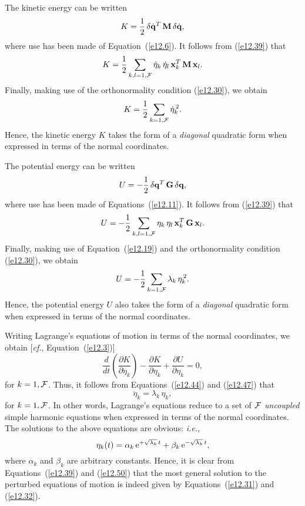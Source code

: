 The kinetic
energy can be written 
\begin{equation}
K = \frac{1}{2}\,\delta \dot{\bf q}^T\,{\bf M}\,\delta\dot{\bf q},
\end{equation}
where use has been made of Equation~(\ref{e12.6}).
It follows from (\ref{e12.39}) that
\begin{equation}
K = \frac{1}{2}\sum_{k,l=1,{\cal F}} \dot{\eta}_k\,\dot{\eta}_l\,{\bf x}_k^T\,{\bf M}\,{\bf x}_l.
\end{equation}
Finally, making use of the orthonormality condition (\ref{e12.30}),
we obtain
\begin{equation}\label{e12.44}
K = \frac{1}{2}\sum_{k=1,{\cal F}}\dot{\eta}_k^{\,2}.
\end{equation}
Hence,  the kinetic energy $K$ takes the form of a {\em diagonal}\/ quadratic form when expressed in terms of the normal coordinates.

The potential energy can be written
\begin{equation}
U=- \frac{1}{2}\,\delta {\bf q}^T\,{\bf G}\,\delta{\bf q},
\end{equation}
where use has been made of Equations~(\ref{e12.11}). It follows from (\ref{e12.39}) that
\begin{equation}
U =- \frac{1}{2}\sum_{k,l=1,{\cal F}} \eta_k\,\eta_l\,{\bf x}_k^T\,{\bf G}\,{\bf x}_l.
\end{equation}
Finally, making use of Equation~(\ref{e12.19}) and the orthonormality condition (\ref{e12.30}),
we obtain
\begin{equation}\label{e12.47}
U = -\frac{1}{2}\sum_{k=1,{\cal F}}\lambda_k\, \eta_k^{\,2}.
\end{equation}
Hence, the potential energy $U$ also takes the form of a {\em diagonal}\/ quadratic form when expressed in terms of the normal coordinates.

Writing Lagrange's equations of motion in terms of the normal
coordinates, we obtain [{\em cf.},  Equation~(\ref{e12.3})]
\begin{equation}
\frac{d}{dt}\!\left(\frac{\partial K}{\partial \dot{\eta}_k}\right) - \frac{\partial K}{\partial \eta_k}+ \frac{\partial U}{\partial \eta_k} = 0,
\end{equation}
for $k=1,{\cal F}$. Thus, it follows from Equations~(\ref{e12.44}) and (\ref{e12.47})
that
\begin{equation}
\ddot{\eta}_k = \lambda_k\,\eta_k,
\end{equation}
for $k=1,{\cal F}$. In other words, Lagrange's equations reduce to a set of
${\cal F}$ {\em uncoupled}\/ simple harmonic equations when expressed in terms
of the normal coordinates. The solutions to the above equations are obvious:
{\em i.e.}, 
\begin{equation}\label{e12.50}
\eta_k(t) = \alpha_k \,{\rm e}^{+\sqrt{\lambda_k}\,t}+\beta_k\,{\rm e}^{-\sqrt{\lambda_k}\,t},
\end{equation}
where $\alpha_k$ and $\beta_k$ are arbitrary constants. Hence, it is clear from Equations~(\ref{e12.39}) and (\ref{e12.50}) that the most general solution to
the perturbed equations of motion is indeed given by Equations~(\ref{e12.31})
and (\ref{e12.32}).

